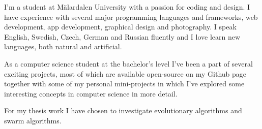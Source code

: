 

\begin{cvparagraph}

I'm a student at Mälardalen University with a passion for coding and design. I have experience with several major programming languages and frameworks, web development, app development, graphical design and photography. I speak English, Swedish, Czech, German and Russian fluently and I love learn new languages, both natural and artificial.

As a computer science student at the bachelor's level I've been a part of several exciting projects, most of which are available open-source on my Github page together with some of my personal mini-projects in which I've explored some interesting concepts in computer science in more detail.

For my thesis work I have chosen to investigate evolutionary algorithms and swarm algorithms.
\end{cvparagraph}
